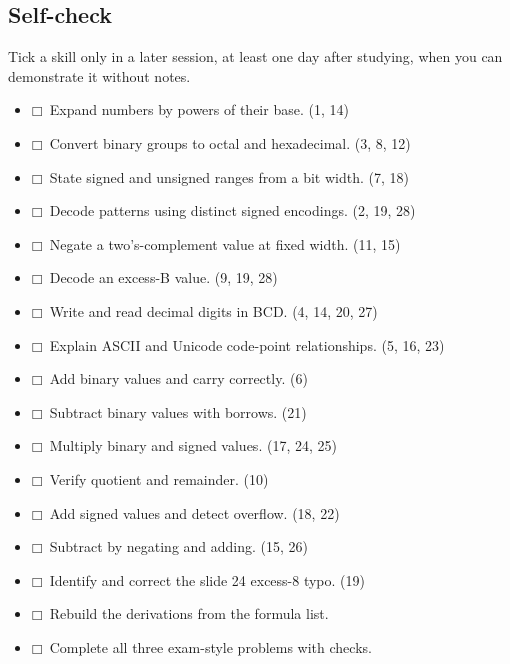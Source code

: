 \documentclass[11pt]{article}
\begin{document}
\begin{keepsection}
\section{Self-check}

Tick a skill only in a later session, at least one day after studying, when you can demonstrate it without notes.

\begin{itemize}
\item $\mdlgwhtsquare$\ Expand numbers by powers of their base. (1, 14)
\item $\mdlgwhtsquare$\ Convert binary groups to octal and hexadecimal. (3, 8, 12)
\item $\mdlgwhtsquare$\ State signed and unsigned ranges from a bit width. (7, 18)
\item $\mdlgwhtsquare$\ Decode patterns using distinct signed encodings. (2, 19, 28)
\item $\mdlgwhtsquare$\ Negate a two’s-complement value at fixed width. (11, 15)
\item $\mdlgwhtsquare$\ Decode an excess-B value. (9, 19, 28)
\item $\mdlgwhtsquare$\ Write and read decimal digits in BCD. (4, 14, 20, 27)
\item $\mdlgwhtsquare$\ Explain ASCII and Unicode code-point relationships. (5, 16, 23)
\item $\mdlgwhtsquare$\ Add binary values and carry correctly. (6)
\item $\mdlgwhtsquare$\ Subtract binary values with borrows. (21)
\item $\mdlgwhtsquare$\ Multiply binary and signed values. (17, 24, 25)
\item $\mdlgwhtsquare$\ Verify quotient and remainder. (10)
\item $\mdlgwhtsquare$\ Add signed values and detect overflow. (18, 22)
\item $\mdlgwhtsquare$\ Subtract by negating and adding. (15, 26)
\item $\mdlgwhtsquare$\ Identify and correct the slide 24 excess-8 typo. (19)
\item $\mdlgwhtsquare$\ Rebuild the derivations from the formula list.
\item $\mdlgwhtsquare$\ Complete all three exam-style problems with checks.
\end{itemize}
\end{keepsection}
\end{document}
